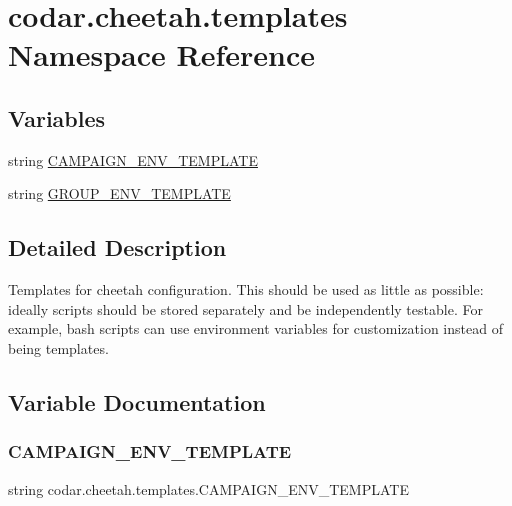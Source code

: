 \hypertarget{namespacecodar_1_1cheetah_1_1templates}{}\section{codar.\+cheetah.\+templates Namespace Reference}
\label{namespacecodar_1_1cheetah_1_1templates}
\subsection*{Variables}
\begin{DoxyCompactItemize}
\item 
string \hyperlink{namespacecodar_1_1cheetah_1_1templates_a95cd1c28dbb2f235ef6be369f57e36f8}{C\+A\+M\+P\+A\+I\+G\+N\+\_\+\+E\+N\+V\+\_\+\+T\+E\+M\+P\+L\+A\+TE}
\item 
string \hyperlink{namespacecodar_1_1cheetah_1_1templates_a5f3128e651f6b9b80eb8c492b2f3edd1}{G\+R\+O\+U\+P\+\_\+\+E\+N\+V\+\_\+\+T\+E\+M\+P\+L\+A\+TE}
\end{DoxyCompactItemize}


\subsection{Detailed Description}
\begin{DoxyVerb}Templates for cheetah configuration. This should be used as little as possible:
ideally scripts should be stored separately and be independently testable.
For example, bash scripts can use environment variables for customization
instead of being templates.
\end{DoxyVerb}
 

\subsection{Variable Documentation}
\mbox{\label{namespacecodar_1_1cheetah_1_1templates_a95cd1c28dbb2f235ef6be369f57e36f8}} 
\subsubsection{\texorpdfstring{C\+A\+M\+P\+A\+I\+G\+N\+\_\+\+E\+N\+V\+\_\+\+T\+E\+M\+P\+L\+A\+TE}{CAMPAIGN\_ENV\_TEMPLATE}}
{\footnotesize\ttfamily string codar.\+cheetah.\+templates.\+C\+A\+M\+P\+A\+I\+G\+N\+\_\+\+E\+N\+V\+\_\+\+T\+E\+M\+P\+L\+A\+TE}

